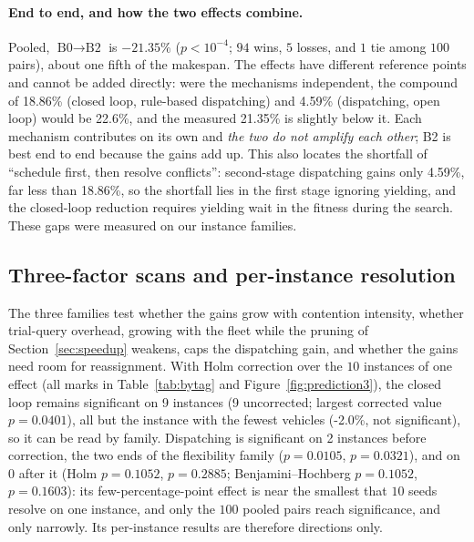 \documentclass[preprint,review,12pt,authoryear,doubleblind]{elsarticle}
\newcommand{\NCases}{10}
\newcommand{\NSeeds}{10}
\newcommand{\NPairs}{100}
\newcommand{\GainLoopRule}{18.86\%}      %
\newcommand{\GainProbeOpen}{4.59\%}      %
\newcommand{\GainEndToEnd}{21.35\%}      %
\newcommand{\PEndToEnd}{<10^{-4}}
\newcommand{\WinEndToEnd}{94}
\newcommand{\LoseEndToEnd}{5}
\newcommand{\GainIndepProduct}{22.6\%}
\newcommand{\CellsSigLoop}{9}
\newcommand{\CellsSigLoopAdj}{9}
\newcommand{\CellsSigProbe}{2}
\newcommand{\CellsSigProbeAdj}{0}
\newcommand{\GainLoopStarve}{-2.0\%}     %
\newcommand{\PProbeFlexLoRaw}{=0.0105}
\newcommand{\PProbeFlexLoHolm}{=0.1052}
\newcommand{\PProbeFlexLoBH}{=0.1052}
\newcommand{\PProbeFlexHiRaw}{=0.0321}
\newcommand{\PProbeFlexHiHolm}{=0.2885}
\newcommand{\PProbeFlexHiBH}{=0.1603}
\newcommand{\PLoopCellMax}{=0.0401}
\begin{document}
\paragraph{End to end, and how the two effects combine.}
\label{sec:complement}
Pooled, $\text{B0}\to\text{B2}$ is $-\GainEndToEnd$ ($p\PEndToEnd$; $\WinEndToEnd$ wins, $\LoseEndToEnd$ losses, and $1$ tie among $\NPairs$ pairs), about one fifth of the makespan.
The effects have different reference points and cannot be added directly: were the mechanisms independent, the compound of \GainLoopRule{} (closed loop, rule-based dispatching) and \GainProbeOpen{} (dispatching, open loop) would be \GainIndepProduct{}, and the measured \GainEndToEnd{} is slightly below it.
Each mechanism contributes on its own and \emph{the two do not amplify each other}; B2 is best end to end because the gains add up.
This also locates the shortfall of ``schedule first, then resolve conflicts'': second-stage dispatching gains only \GainProbeOpen{}, far less than \GainLoopRule{}, so the shortfall lies in the first stage ignoring yielding, and the closed-loop reduction requires yielding wait in the fitness during the search. These gaps were measured on our instance families.

\subsection{Three-factor scans and per-instance resolution}
\label{sec:whichcongestion}

The three families test whether the gains grow with contention intensity, whether trial-query overhead, growing with the fleet while the pruning of Section~\ref{sec:speedup} weakens, caps the dispatching gain, and whether the gains need room for reassignment.
With Holm correction over the $\NCases$ instances of one effect (all marks in Table~\ref{tab:bytag} and Figure~\ref{fig:prediction3}), the closed loop remains significant on \CellsSigLoopAdj{} instances (\CellsSigLoop{} uncorrected; largest corrected value $p\PLoopCellMax$), all but the instance with the fewest vehicles (\GainLoopStarve{}, not significant), so it can be read by family.
Dispatching is significant on \CellsSigProbe{} instances before correction, the two ends of the flexibility family ($p\PProbeFlexLoRaw$, $p\PProbeFlexHiRaw$), and on \CellsSigProbeAdj{} after it (Holm $p\PProbeFlexLoHolm$, $p\PProbeFlexHiHolm$; Benjamini--Hochberg $p\PProbeFlexLoBH$, $p\PProbeFlexHiBH$): its few-percentage-point effect is near the smallest that $\NSeeds$ seeds resolve on one instance, and only the $\NPairs$ pooled pairs reach significance, and only narrowly.
Its per-instance results are therefore directions only.
\end{document}
